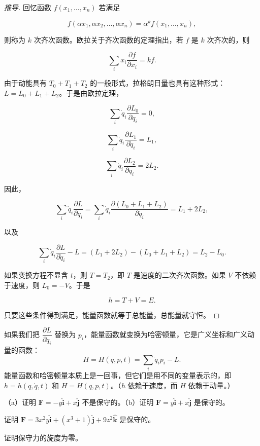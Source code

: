 \begin{proof}[推导]
回忆函数 $f(x_1, \ldots, x_n)$ 若满足

\[
f(\alpha x_1, \alpha x_2, \ldots, \alpha x_n) = \alpha^k f(x_1, \ldots, x_n),
\]

则称为 $k$ 次齐次函数。欧拉关于齐次函数的定理指出，若 $f$ 是 $k$ 次齐次的，则

\[
\sum_i x_i\frac{\partial f}{\partial x_i} = kf.
\]

由于动能具有 $T_0 + T_1 + T_2$ 的一般形式，拉格朗日量也具有这种形式：$L = L_0 + L_1 + L_2$。于是由欧拉定理，

\[
\sum_i\dot{q}_i\frac{\partial L_0}{\partial \dot{q}_i} = 0,
\]

\[
\sum_i\dot{q}_i\frac{\partial L_1}{\partial \dot{q}_i} = L_1,
\]

\[
\sum_i\dot{q}_i\frac{\partial L_2}{\partial \dot{q}_i} = 2L_2.
\]

因此，

\[
\sum_i\dot{q}_i\frac{\partial L}{\partial \dot{q}_i} = \sum_i\dot{q}_i\frac{\partial (L_0 + L_1 + L_2)}{\partial \dot{q}_i} = L_1 + 2L_2,
\]

以及

\[
\sum_i\dot{q}_i\frac{\partial L}{\partial \dot{q}_i} - L = (L_1 + 2L_2) - (L_0 + L_1 + L_2) = L_2 - L_0.
\]

如果变换方程不显含 $t$，则 $T = T_2$，即 $T$ 是速度的二次齐次函数。如果 $V$ 不依赖于速度，则 $L_0 = -V$。于是

\[
h = T + V = E.
\]

只要这些条件得到满足，能量函数就等于总能量，总能量就守恒。
\end{proof}
如果我们把 $\dfrac{\partial L}{\partial \dot{q}_i}$ 替换为 $p_i$，能量函数就变换为哈密顿量，它是广义坐标和广义动量的函数：
\[
H = H(q, p, t) = \sum_i\dot{q}_ip_i - L.
\]
能量函数和哈密顿量本质上是一回事，但它们是用不同的变量表示的，即 $h = h(q, \dot{q}, t)$ 和 $H = H(q, p, t)$。（$h$ 依赖于速度，而 $H$ 依赖于动量。）
\begin{example}[例题 4.5]
（a）证明 $\mathbf{F} = -y\hat{\mathbf{i}} + x\hat{\mathbf{j}}$ 不是保守的。（b）证明 $\mathbf{F} = y\hat{\mathbf{i}} + x\hat{\mathbf{j}}$ 是保守的。
\end{example}
\begin{example}[例题 4.6]
证明 $\mathbf{F} = 3x^2y\hat{\mathbf{i}} + (x^3 + 1)\hat{\mathbf{j}} + 9z^2\hat{\mathbf{k}}$ 是保守的。
\end{example}
\begin{example}[例题 4.7]
证明保守力的旋度为零。
\end{example}
